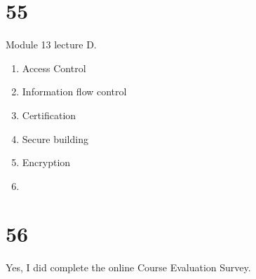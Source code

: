 \documentclass[a4paper,11pt]{article}
\begin{document}
\section*{55}
Module 13 lecture D.
\begin{enumerate}
  \item  Access Control
  \item  Information flow control
  \item  Certification
  \item  Secure building
  \item  Encryption
  \item
\end{enumerate}



\section*{56}
Yes, I did complete the online Course Evaluation Survey.

\end{document}
